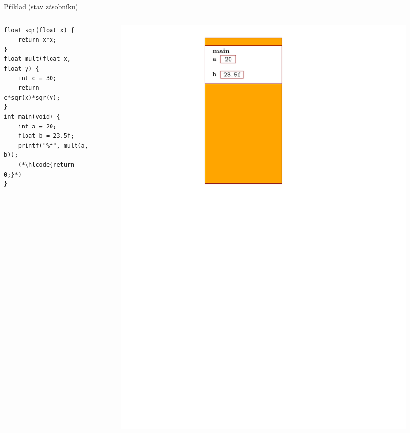 \documentclass[14pt,aspectratio=169]{beamer}
\begin{document}
    \begin{frame}[t,fragile]{Příklad (stav zásobníku)}
        \begin{columns}[onlytextwidth]
            \begin{column}{0.55\textwidth}
                \begin{lstlisting}
float sqr(float x) {
    return x*x;
}
float mult(float x, float y) {
    int c = 30;
    return c*sqr(x)*sqr(y);
}
int main(void) {
    int a = 20;
    float b = 23.5f;
    printf("%f", mult(a, b));
    (*\hlcode{return 0;}*)
}
                \end{lstlisting}
            \end{column}
            \begin{column}{0.4\textwidth}
                \begin{figure}
                    \centering
                    \includegraphics[scale=.6]{images/zasobnik_stav_11.pdf}
                \end{figure}
            \end{column}
        \end{columns}
    \end{frame}
\end{document}
